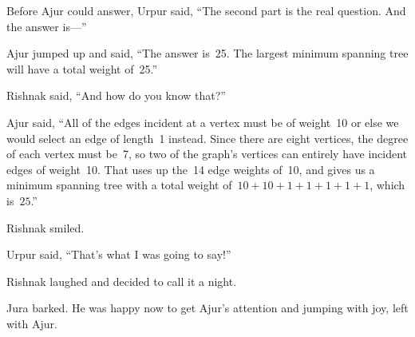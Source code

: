 Before Ajur could answer, Urpur said, ``The second part is the real question. And the answer is---''

Ajur jumped up and said, ``The answer is~25. The largest minimum spanning tree will have a total weight of~25.''

Rishnak said, ``And how do you know that?''

Ajur said, ``All of the edges incident at a vertex must be of weight~10 or else we would select an edge of length~1 instead.  Since there are eight vertices, the degree of each vertex must be~7, so two of the graph's vertices can entirely have incident edges of weight~10. That uses up the~14 edge weights of~10, and gives us a minimum spanning tree with a total weight of~$10+10+1+1+1+1+1$, which is~$25$.''

Rishnak smiled.

Urpur said, ``That's what I was going to say!''

Rishnak laughed and decided to call it a night.

Jura barked. He was happy now to get Ajur's attention and jumping with joy, left with Ajur.
